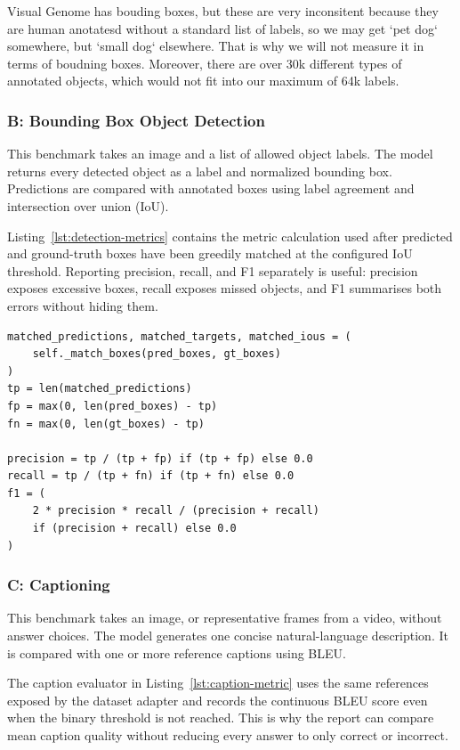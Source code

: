 ﻿\documentclass[11pt,a4paper]{article}
\begin{document}
Visual Genome has bouding boxes, but these are very inconsitent because they are human anotatesd without a standard list of labels, so we may get `pet dog` somewhere, but `small dog` elsewhere. That is why we will not measure it in terms of boudning boxes. Moreover, there are over 30k different types of annotated objects, which would not fit into our maximum of 64k labels.

\subsubsection{\textbf{B}: Bounding Box Object Detection}

This benchmark takes an image and a list of allowed object labels. The model returns every detected object as a label and normalized bounding box. Predictions are compared with annotated boxes using label agreement and intersection over union (IoU).

Listing~\ref{lst:detection-metrics} contains the metric calculation used after
predicted and ground-truth boxes have been greedily matched at the configured
IoU threshold. Reporting precision, recall, and F1 separately is useful:
precision exposes excessive boxes, recall exposes missed objects, and F1
summarises both errors without hiding them.

\begin{lstlisting}[caption={Detection scoring from
\texttt{benchmarks/detection/\_detection.py}.},
label={lst:detection-metrics}]
matched_predictions, matched_targets, matched_ious = (
    self._match_boxes(pred_boxes, gt_boxes)
)
tp = len(matched_predictions)
fp = max(0, len(pred_boxes) - tp)
fn = max(0, len(gt_boxes) - tp)

precision = tp / (tp + fp) if (tp + fp) else 0.0
recall = tp / (tp + fn) if (tp + fn) else 0.0
f1 = (
    2 * precision * recall / (precision + recall)
    if (precision + recall) else 0.0
)
\end{lstlisting}

\subsubsection{\textbf{C}: Captioning}

This benchmark takes an image, or representative frames from a video, without answer choices. The model generates one concise natural-language description. It is compared with one or more reference captions using BLEU.

The caption evaluator in Listing~\ref{lst:caption-metric} uses the same
references exposed by the dataset adapter and records the continuous BLEU
score even when the binary threshold is not reached. This is why the report
can compare mean caption quality without reducing every answer to only correct
or incorrect.
\end{document}
